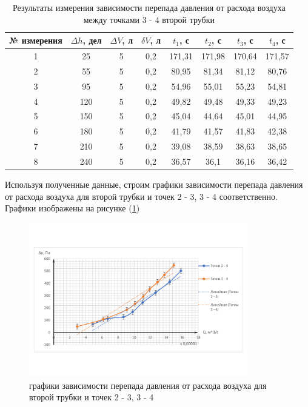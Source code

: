 \documentclass[12pt,a4paper]{article}
\begin{document}
\begin{table}[h!]
\centering
\begin{tabular}{|c|c|c|c|c|c|c|c|}
\hline
№ измерения & $\Delta h$, дел & $\Delta V$, л & $\delta V$, л & $t_{1}$, с & $t_{2}$, с & $t_{3}$, с & $t_{4}$, с \\ \hline
1           & 25              & 5             & 0,2           & 171,31     & 171,98     & 170,64     & 171,57     \\ \hline
2           & 55              & 5             & 0,2           & 80,95      & 81,34      & 81,12      & 80,76      \\ \hline
3           & 95              & 5             & 0,2           & 54,96      & 55,01      & 55,23      & 54,81      \\ \hline
4           & 120             & 5             & 0,2           & 49,82      & 49,48      & 49,33      & 49,23      \\ \hline
5           & 150             & 5             & 0,2           & 45,04      & 44,64      & 45,01      & 44,95      \\ \hline
6           & 180             & 5             & 0,2           & 41,79      & 41,57      & 41,83      & 42,38      \\ \hline
7           & 210             & 5             & 0,2           & 39,08      & 38,59      & 38,63      & 38,65      \\ \hline
8           & 240             & 5             & 0,2           & 36,57      & 36,1       & 36,16      & 36,42      \\ \hline
\end{tabular}
\caption{Результаты измерения зависимости перепада давления от расхода воздуха между точками 3 - 4 второй трубки}
\label{tab:flow_measuring_3_4_second_tube}
\end{table}

Используя полученные данные, строим графики зависимости перепада давления от расхода воздуха для второй трубки и точек 2 - 3, 3 - 4 соответственно. Графики изображены на рисунке (\ref{fig:graph_1})

\begin{figure}[h!]
	\begin{center}
		\includegraphics[width = 0.85\textwidth]{Results_of_measuring}
		\caption{графики зависимости перепада давления от расхода воздуха для второй трубки и точек 2 - 3, 3 - 4}
		\label{fig:graph_1}
	\end{center}
\end{figure}
\end{document}

